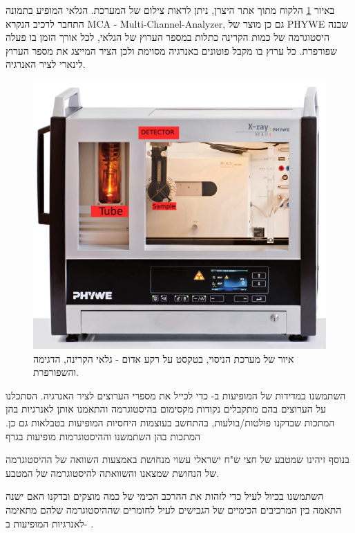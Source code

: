 \documentclass{article}
\begin{document}
באיור
\ref{fig:experiment_scheme}
הלקוח מתוך אתר היצרן, ניתן לראות צילום של המערכת. 
הגלאי המופיע בתמונה התחבר לרכיב הנקרא
\textenglish{MCA - Multi-Channel-Analyzer},
גם כן מוצר של
\textenglish{PHYWE}
שבנה היסטוגרמה של כמות הקרינה כתלות במספר הערוץ של הגלאי, לכל אורך הזמן בו פעלה שפורפרת. כל ערוץ בו מקבל פוטונים באנרגיה מסוימת ולכן הציר המייצג את מספר הערוץ לינארי לציר האנרגיה.

\begin{figure}
    \centering
    \includegraphics[width=\textwidth]{./system.png}
    \caption{
    איור של מערכת הניסוי, בטקסט על רקע אדום - גלאי הקרינה, הדגימה והשפורפרת.
    }
    \label{fig:experiment_scheme}
\end{figure}

השתמשנו במדידות של המופיעות ב-
\cite{xrayBooklet}
כדי לכייל את מספרי הערוצים לציר האנרגיה. הסתכלנו על הערוצים בהם מתקבלים נקודות מקסימום בהיסטוגרמה והתאמנו אותן לאנרגיות בהן המתכות שבדקנו פולטות/בולעות, בהתחשב בעוצמות היחסיות המופיעות בטבלאות גם כן. המתכות בהן השתמשנו וההיסטוגרמות מופיעות בגרף

בנוסף זיהינו שמטבע של חצי ש"ח ישראלי עשוי מנחושת באמצעות השוואה של ההיסטוגרמה של הנחושת שמצאנו והשוואתה להיסטוגרמה של המטבע.

השתמשנו בכיול לעיל כדי לזהות את ההרכב הכימי של כמה מוצקים ובדקנו האם ישנה התאמה בין המרכיבים הכימיים של הגבישים לעיל לחומרים שההיסטוגרמה שלהם מתאימה לאנרגיות המופיעות ב-
\cite{xrayBooklet}.
\end{document}
